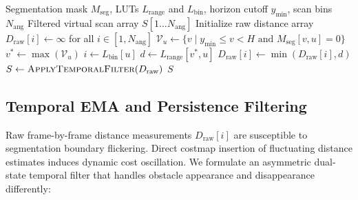 \documentclass{ieeeaccess}
\begin{document}
\begin{algorithm}[t]
\caption{Virtual LaserScan Generation}
\label{alg:virtual_scan}
\begin{algorithmic}[1]
\Require Segmentation mask $M_{\mathrm{seg}}$, LUTs $L_{\mathrm{range}}$ and $L_{\mathrm{bin}}$, horizon cutoff $y_{\min}$, scan bins $N_{\mathrm{ang}}$
\Ensure Filtered virtual scan array $S[1 \dots N_{\mathrm{ang}}]$
\State Initialize raw distance array $D_{\mathrm{raw}}[i] \gets \infty$ for all $i \in [1, N_{\mathrm{ang}}]$
    \State $\mathcal{V}_u \gets \{v \mid y_{\min} \le v < H \text{ and } M_{\mathrm{seg}}[v, u] = 0\}$
        \State $v^* \gets \max(\mathcal{V}_u)$ 
        \State $i \gets L_{\mathrm{bin}}[u]$
        \State $d \gets L_{\mathrm{range}}[v^*, u]$
        \State $D_{\mathrm{raw}}[i] \gets \min(D_{\mathrm{raw}}[i], d)$
    \EndIf
\EndFor
\State $S \gets \textsc{ApplyTemporalFilter}(D_{\mathrm{raw}})$
\State \Return $S$
\end{algorithmic}
\end{algorithm}

\subsection{Temporal EMA and Persistence Filtering}
\label{subsec:temporal_filter}
Raw frame-by-frame distance measurements $D_{\mathrm{raw}}[i]$ are susceptible to segmentation boundary flickering. Direct costmap insertion of fluctuating distance estimates induces dynamic cost oscillation. We formulate an asymmetric dual-state temporal filter that handles obstacle appearance and disappearance differently:
\end{document}
